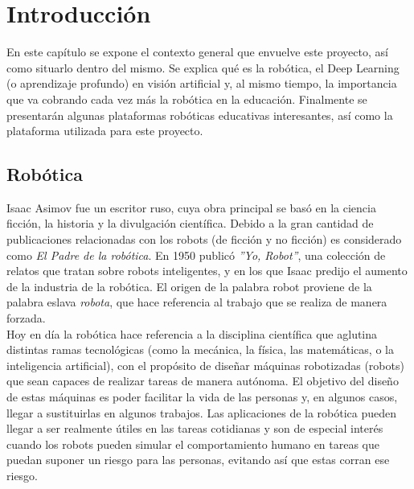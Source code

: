 \documentclass{report}
\begin{document}
\setcounter{tocdepth}{3} %
\renewcommand{\contentsname}{Índice general}
\tableofcontents
\clearpage

\renewcommand{\listfigurename}{Índice de figuras}
\listoffigures

\renewcommand{\chaptername}{Capítulo}
\chapter{Introducción}

En este capítulo se expone el contexto general que envuelve este proyecto, así como situarlo dentro del mismo. Se explica qué es la robótica, el Deep Learning (o aprendizaje profundo) en visión artificial y, al mismo tiempo, la importancia que va cobrando cada vez más la robótica en la educación. Finalmente se presentarán algunas plataformas robóticas educativas interesantes, así como la plataforma utilizada para este proyecto.

\section{Robótica}

Isaac Asimov fue un escritor ruso, cuya obra principal se basó en la ciencia ficción, la historia y la divulgación científica. Debido a la gran cantidad de publicaciones relacionadas con los robots (de ficción y no ficción) es considerado como \textit{El Padre de la robótica}. En 1950 publicó \textit{''Yo, Robot''}, una colección de relatos que tratan sobre robots inteligentes, y en los que Isaac predijo el aumento de la industria de la robótica. El origen de la palabra robot proviene de la palabra eslava \textit{robota}, que hace referencia al trabajo que se realiza de manera forzada. \cite{Isaac}
\\

Hoy en día la robótica hace referencia a la disciplina científica que aglutina distintas ramas tecnológicas (como la mecánica, la física, las matemáticas, o la inteligencia artificial), con el propósito de diseñar máquinas robotizadas (robots) que sean capaces de realizar tareas de manera autónoma. El objetivo del diseño de estas máquinas es poder facilitar la vida de las personas y, en algunos casos, llegar a sustituirlas en algunos trabajos. Las aplicaciones de la robótica pueden llegar a ser realmente útiles en las tareas cotidianas y son de especial interés  cuando los robots pueden simular el comportamiento humano en tareas que puedan suponer un riesgo para las personas, evitando así que estas corran ese riesgo.
\\
\end{document}
